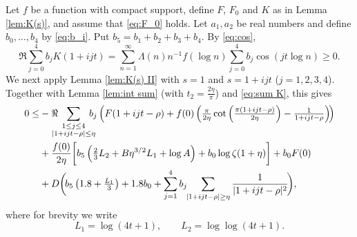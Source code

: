 \documentclass[10pt]{amsart}
\theoremstyle{remark}
\theoremstyle{plain}
\numberwithin{equation}{section}
\theoremstyle{definition}
\def\({\left(}
\def\){\right)}
\def\nts{\negthickspace}
\begin{document}
Let $f$ be a function with compact support, define
$F$, $F_0$ and $K$ as in Lemma \ref{lem:K(s)}, and assume
that \eqref{eq:F_0} holds.
Let $a_1,a_2$ be real numbers and define $b_0,\ldots,b_4$ by
\eqref{eq:b_i}.  Put $b_5=b_1+b_2+b_3+b_4$. 
By \eqref{eq:cos},
\begin{equation}
\Re \sum_{j=0}^4 b_j K(1+ijt)
= \sum_{n=1}^\infty \Lambda(n) n^{-1} f(\log n) \sum_{j=0}^4 b_j 
\cos(jt\log n) \ge 0. \label{eq:sum K}
\end{equation}
We next apply Lemma \ref{lem:K(s) II} with $s=1$ and $s=1+ijt$ ($j=1,2,3,4$).
Together with Lemma \ref{lem:int sum} (with $t_2=\frac{2\eta}{\pi}$)
and \eqref{eq:sum K}, this gives
\begin{equation}
\begin{split}
0 \le& - \Re \nts\nts\nts 
  \sum_{\substack{1\le j\le 4 \\ |1+ijt-\rho| \le \eta}}
  \nts\nts\nts b_j \( F(1+ijt-\rho) + f(0) \( \tfrac{\pi}{2\eta} \cot\(
  \tfrac{\pi(1+ijt-\rho)}{2\eta}\) -\tfrac{1}{1+ijt-\rho} \)\! \)\\
&+ \frac{f(0)}{2\eta} \biggl[ b_5 \( \tfrac23 L_2 + B \eta^{3/2}L_1 +\log A\)
   + b_0 \log\zeta(1+\eta) \biggr]+b_0F(0) \\
&+ D \biggl(\! b_5 \( 1.8 + \tfrac{L_1}{3}\) + 1.8b_0 +
  \sum_{j=1}^4 b_j \nts \sum_{|1+ijt-\rho| \ge \eta} \frac{1}
  {|1+ijt-\rho|^2}\! \biggr),
\end{split}
\label{eq:big 1}
\end{equation}
where for brevity we write 
$$
L_1=\log(4t+1), \qquad L_2=\log\log(4t+1).
$$
\end{document}

